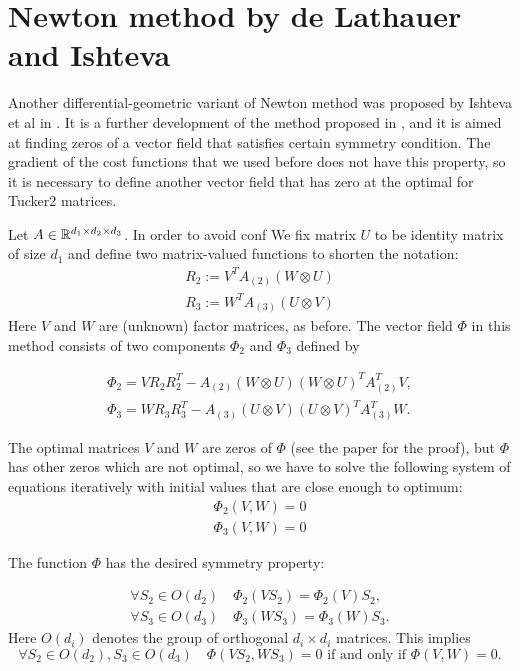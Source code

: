 \section{Newton method by de Lathauer and Ishteva}

Another differential-geometric variant of Newton method
was proposed by Ishteva et al in \cite{IDLAVH09}.
It is a further development of the method proposed in 
\cite{absil_2009}, and it is aimed at finding zeros
of a vector field that satisfies certain symmetry condition.
The gradient of the cost functions that we used before
does not have this property, so it is necessary to
define another vector field that has zero at the optimal
for Tucker2 matrices.  

Let $A \in \mathbb{R}^{d_1 \times d_2 \times d_3}$. In order to avoid conf
We fix matrix $U$ to be identity matrix of size $d_1$ and define two matrix-valued functions to shorten the notation:
\begin{eqnarray}
 R_2 := V^T A_{(2)} ( W \otimes U) \\
 R_3 := W^T A_{(3)} ( U \otimes V) 
\end{eqnarray}
Here $V$ and $W$ are (unknown) factor matrices, as before.
The vector field $\Phi$ in this method consists of two components
$\Phi_2$ and $\Phi_3$ defined by

\begin{eqnarray}
 \Phi_2 = V R_2 R_2^T - A_{(2)} ( W \otimes U)(W \otimes U)^T A_{(2)}^T V, \\
 \Phi_3 = W R_3 R_3^T - A_{(3)} ( U \otimes V)(U \otimes V)^T A_{(3)}^T W. 
\end{eqnarray}

The optimal matrices $V$ and $W$ are zeros of $\Phi$ (see the paper for the proof),
but $\Phi$ has other zeros which are not optimal, so we have to solve
the following system of equations iteratively with 
initial values that are close enough to optimum:
\begin{eqnarray}
    \Phi_2(V, W) = 0 \\
    \Phi_3(V, W) = 0
\end{eqnarray}

The function $\Phi$ has the desired symmetry property: 

\begin{eqnarray}
\forall S_2 \in O(d_2) \quad \Phi_2(VS_2) = \Phi_2(V) S_2, \\
\forall S_3 \in O(d_3) \quad \Phi_3(WS_3) = \Phi_3(W) S_3. 
\end{eqnarray}
Here $O(d_i)$ denotes the group of orthogonal $d_i \times d_i$ matrices. This implies
\begin{equation}
\forall S_2 \in O(d_2), S_3 \in O(d_3) \quad \Phi(VS_2, WS_3)= 0 \mbox{ if and only if } \Phi(V, W) = 0.
\end{equation}

